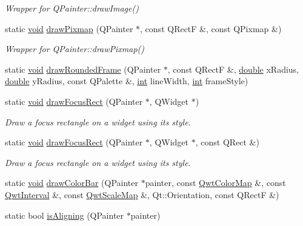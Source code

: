 \begin{DoxyCompactItemize}
\begin{DoxyCompactList}\small\item\em Wrapper for Q\-Painter\-::draw\-Image() \end{DoxyCompactList}\item 
static \hyperlink{group___u_a_v_objects_plugin_ga444cf2ff3f0ecbe028adce838d373f5c}{void} \hyperlink{class_qwt_painter_aec25b066b31a967de60d645c58ed7557}{draw\-Pixmap} (Q\-Painter $\ast$, const Q\-Rect\-F \&, const Q\-Pixmap \&)
\begin{DoxyCompactList}\small\item\em Wrapper for Q\-Painter\-::draw\-Pixmap() \end{DoxyCompactList}\item 
static \hyperlink{group___u_a_v_objects_plugin_ga444cf2ff3f0ecbe028adce838d373f5c}{void} \hyperlink{class_qwt_painter_a00b91696b5dc3264b54c99e436616804}{draw\-Rounded\-Frame} (Q\-Painter $\ast$, const Q\-Rect\-F \&, \hyperlink{_super_l_u_support_8h_a8956b2b9f49bf918deed98379d159ca7}{double} x\-Radius, \hyperlink{_super_l_u_support_8h_a8956b2b9f49bf918deed98379d159ca7}{double} y\-Radius, const Q\-Palette \&, \hyperlink{ioapi_8h_a787fa3cf048117ba7123753c1e74fcd6}{int} line\-Width, \hyperlink{ioapi_8h_a787fa3cf048117ba7123753c1e74fcd6}{int} frame\-Style)
\item 
static \hyperlink{group___u_a_v_objects_plugin_ga444cf2ff3f0ecbe028adce838d373f5c}{void} \hyperlink{class_qwt_painter_abb6bbb26f325e33236c5292107e44102}{draw\-Focus\-Rect} (Q\-Painter $\ast$, Q\-Widget $\ast$)
\begin{DoxyCompactList}\small\item\em Draw a focus rectangle on a widget using its style. \end{DoxyCompactList}\item 
static \hyperlink{group___u_a_v_objects_plugin_ga444cf2ff3f0ecbe028adce838d373f5c}{void} \hyperlink{class_qwt_painter_aa83afab9c2cdedfdc52d747dcd140114}{draw\-Focus\-Rect} (Q\-Painter $\ast$, Q\-Widget $\ast$, const Q\-Rect \&)
\begin{DoxyCompactList}\small\item\em Draw a focus rectangle on a widget using its style. \end{DoxyCompactList}\item 
static \hyperlink{group___u_a_v_objects_plugin_ga444cf2ff3f0ecbe028adce838d373f5c}{void} \hyperlink{class_qwt_painter_ae1009209978e5bb3f390905b81fb699f}{draw\-Color\-Bar} (Q\-Painter $\ast$painter, const \hyperlink{class_qwt_color_map}{Qwt\-Color\-Map} \&, const \hyperlink{class_qwt_interval}{Qwt\-Interval} \&, const \hyperlink{class_qwt_scale_map}{Qwt\-Scale\-Map} \&, Qt\-::\-Orientation, const Q\-Rect\-F \&)
\item 
static bool \hyperlink{class_qwt_painter_a5d62fd1bd470fa0d42b7b2e06504a581}{is\-Aligning} (Q\-Painter $\ast$painter)
\end{DoxyCompactItemize}


